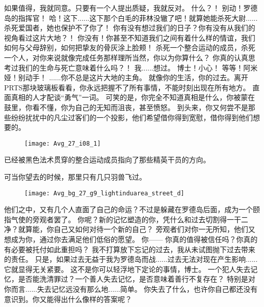 \documentclass[openany]{book}
\begin{document}
\begin{dialogue}
     如果值得，我就同意。只要有一个人提出质疑，我就反对。
     什么？！
     别动！罗德岛的指挥官！
     哈！这下......这下那个白毛的菲林没辙了吧！就算她能杀死大尉......杀死爱国者，她也保护不了你了！
     你有没有想过我们的日子？你有没有从我们的视角看过这片大地？！
     你没有！你甚至不知道我们之间有着什么样的情谊，我们如何与父母辞别，如何把挚友的骨灰涂上脸颊！
     杀死一个整合运动的成员，杀死一个人，对你来说就像完成任务那样理所当然，你以为你算什么？
     你真的认真思考过我们的生命与死亡意味着什么吗？！
     我......想过。
     博士！小心！
     等等！阿米娅！别动手！
     ......你不总是这片大地的主角。
     就像你的生活，你的过去。离开PRTS那块玻璃板看看，你永远把握不了所有事情，不能时刻出现在所有地方。
     直面真相的人才配谈“勇气”一词。
     可笑的是，你完全不知道真相是什么，你被蒙在鼓里，你看不懂，你为自己的无知而沮丧，甚至愤怒。
     到头来，你又何尝不是那些纷纷扰扰中的凡尘过客们的一个投影，他们希望借你得到宽慰，借你得到他们想要的。\par
    \begin{figure}[h]
        \centering
        \texttt{[image: Avg\_27\_i08\_1]}
    \end{figure}
    已经被黑色法术贯穿的整合运动成员指向了那些精英干员的方向。\par
    可当你望去的时候，那里只有几只羽兽飞过。\par
    \begin{figure}[h]
        \centering
        \texttt{[image: Avg\_bg\_27\_g9\_lightinduarea\_street\_d]}
    \end{figure}
     他们之中，又有几个人直面了自己的命运？不过是躲藏在罗德岛后面，成为一个颐指气使的旁观者罢了。
     你呢？新的记忆塑造的你，凭什么和过去切割得一干二净？就算能，你自己又如何对待一个新的自己？
     旁观者们对你一无所知，他们又想成为你，通过你去满足他们低俗的愿望。
     你——
     你真的值得被信任吗？你真的有必要被托付如此重担吗？
     我不打算放下忘记的过去，我从未试图抛下过去带来的责任。
     只是，如果过去无益于我为罗德岛而战......过去无法对现在产生影响......
     它就显得无关紧要。
     这不是你可以轻浮地下定论的事情，博士。
     一个犯人失去记忆，是否能洗清罪过？一个善人失去记忆，是否意味着善行不复存在？
     特别是对你而言......失去记忆远没有那么地......简单。
     你失去了什么，也许你自己都还没有意识到。你又能得出什么像样的答案呢？
\end{dialogue}\par
\end{document}
